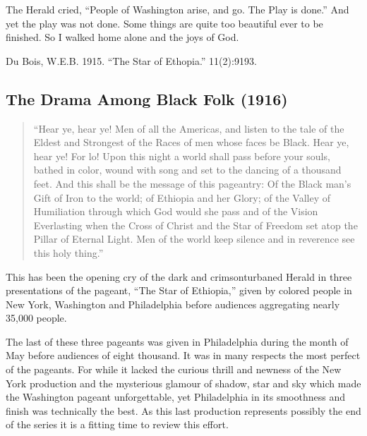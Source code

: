 \documentclass[letterpaper,10pt,english]{jupyterBook}
\begin{document}
\sphinxAtStartPar
The Herald cried, “People of Washington arise, and go. The Play is done.” And yet the play was not done. Some things are quite too beautiful ever to be finished. So I walked home alone and
the joys of God.

\sphinxAtStartPar
{} Du Bois, W.E.B. 1915. “The Star of Ethopia.” 11(2):91\sphinxhyphen{}93.


\subsection{The Drama Among Black Folk (1916)}
\label{\detokenize{Volumes/12/03/drama_among_black_folk:the-drama-among-black-folk-1916}}\label{\detokenize{Volumes/12/03/drama_among_black_folk::doc}}\begin{quote}

\sphinxAtStartPar
“Hear ye, hear ye! Men of all the Americas, and listen to the tale of the Eldest and Strongest of the Races of men whose faces be Black. Hear ye, hear ye! For lo! Upon this night a world shall pass before your souls, bathed in color, wound with song and set to the dancing of a thousand feet. And this shall be the message of this pageantry: Of the Black man’s Gift of Iron to the world; of Ethiopia and her Glory; of the Valley of Humiliation through which God would she pass and of the Vision Everlasting when the Cross of Christ and the Star of Freedom set atop the Pillar of Eternal Light. Men of the world keep silence and in reverence see this holy thing.”
\end{quote}

\sphinxAtStartPar
This has been the opening cry of the dark and crimson\sphinxhyphen{}turbaned Herald in three presentations of the pageant, “The Star of Ethiopia,” given by colored people in New York, Washington and Philadelphia before audiences aggregating nearly 35,000 people.

\begin{sphinxShadowBox}
\sphinxstylesidebartitle{}

\sphinxAtStartPar
{}
\end{sphinxShadowBox}

\sphinxAtStartPar
The last of these three pageants was given in Philadelphia during the month of May before audiences of eight thousand. It was in many respects the most perfect of the pageants. For while it lacked the curious thrill and newness of the New York production and the mysterious glamour of shadow, star and sky which made the Washington pageant unforgettable, yet Philadelphia in its smoothness and finish was technically the best. As this last production represents possibly the end of the series it is a fitting time to review this effort.
\end{document}
